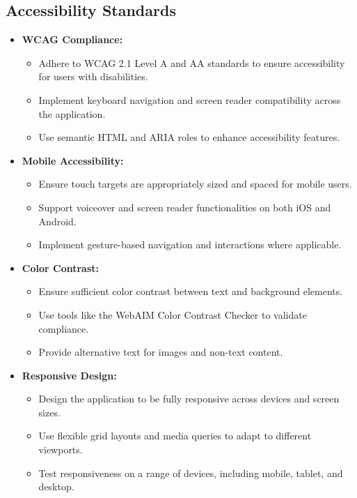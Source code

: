 \subsection{Accessibility Standards}
\begin{itemize}[leftmargin=*]
    \item \textbf{WCAG Compliance:}
    \begin{itemize}
        \item Adhere to WCAG 2.1 Level A and AA standards to ensure accessibility for users with disabilities.
        \item Implement keyboard navigation and screen reader compatibility across the application.
        \item Use semantic HTML and ARIA roles to enhance accessibility features.
    \end{itemize}
    
    \item \textbf{Mobile Accessibility:}
    \begin{itemize}
        \item Ensure touch targets are appropriately sized and spaced for mobile users.
        \item Support voiceover and screen reader functionalities on both iOS and Android.
        \item Implement gesture-based navigation and interactions where applicable.
    \end{itemize}
    
    \item \textbf{Color Contrast:}
    \begin{itemize}
        \item Ensure sufficient color contrast between text and background elements.
        \item Use tools like the WebAIM Color Contrast Checker to validate compliance.
        \item Provide alternative text for images and non-text content.
    \end{itemize}
    
    \item \textbf{Responsive Design:}
    \begin{itemize}
        \item Design the application to be fully responsive across devices and screen sizes.
        \item Use flexible grid layouts and media queries to adapt to different viewports.
        \item Test responsiveness on a range of devices, including mobile, tablet, and desktop.
    \end{itemize}
\end{itemize}

